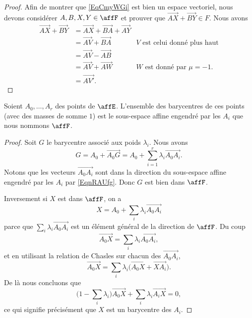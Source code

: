 \begin{proof}
    Afin de montrer que \eqref{EqCmyWGi} est bien un espace vectoriel, nous devons considérer \( A,B,X,Y\in\affF\) et prouver que \( \overrightarrow{ AX }+\overrightarrow{ BY }\in F\). Nous avons
    \begin{subequations}
        \begin{align}
            \overrightarrow{ AX }+\overrightarrow{ BY }&=\overrightarrow{ AX }+\overrightarrow{ BA }+\overrightarrow{ AY }\\
            &=\overrightarrow{ AV }+\overrightarrow{ BA }   & V\text{ est celui donné plus haut}\\
            &=\overrightarrow{ AV }-\overrightarrow{ AB }  \\
            &=\overrightarrow{ AV }+\overrightarrow{ AW }   & W\text{ est donné par } \mu=-1\text{.}\\
            &=\overrightarrow{ AV' }.
        \end{align}
    \end{subequations}
\end{proof}

\begin{proposition}      \label{PropBVbCOS}
    Soient \( A_0,\ldots, A_r\) des points de \( \affE\). L'ensemble des barycentres de ces points (avec des masses de somme \( 1\)) est le sous-espace affine engendré par les \( A_i\) que nous nommons \( \affF\).
\end{proposition}

\begin{proof}
    Soit \( G\) le barycentre associé aux poids \( \lambda_i\). Nous avons
    \begin{equation}
        G=A_0+\overrightarrow{ A_0G }=A_0+\sum_{i=1}^r\lambda_i\overrightarrow{ A_0A_i }.
    \end{equation}
    Notons que les vecteurs \( \overrightarrow{ A_0A_i }\) sont dans la direction du sous-espace affine engendré par les \( A_i\) par \eqref{EqnRAUfg}. Donc \( G\) est bien dans \( \affF\).

    Inversement si $X$ est dans \( \affF\), on a
    \begin{equation}
        X=A_0+\sum_i\lambda_i\overrightarrow{ A_0A_i }
    \end{equation}
    parce que \( \sum_i\lambda_i\overrightarrow{ A_0A_i }\) est un élément général de la direction de \( \affF\). Du coup
    \begin{equation}
        \overrightarrow{ A_0X }=\sum_i\lambda_i\overrightarrow{ A_0A_i },
    \end{equation}
    et en utilisant la relation de Chasles sur chacun des \( \overrightarrow{ A_0A_i }\),
    \begin{equation}
        \overrightarrow{ A_0X }=\sum_i\lambda_i\big( \overrightarrow{ A_0X }+\overrightarrow{ XA_i } \big).
    \end{equation}
    De là nous concluons que
    \begin{equation}
        \big( 1-\sum_i\lambda_i \big)\overrightarrow{ A_0X }+\sum_i\lambda_i\overrightarrow{ A_iX }=0,
    \end{equation}
    ce qui signifie précisément que \( X\) est un barycentre des \( A_i\).
\end{proof}

